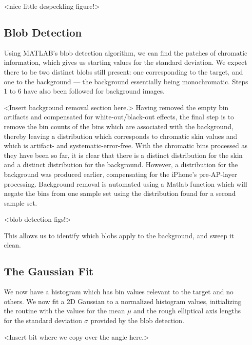 <nice little despeckling figure!>


\subsection{Blob Detection}\label{sec:BlobDetection}
Using MATLAB's blob detection algorithm, we can find the patches of chromatic information, which gives us starting values for the standard deviation. We expect there to be two distinct blobs still present: one corresponding to the target, and one to the background --- the background essentially being monochromatic. Steps 1 to 6 have also been followed for background images. 

<Insert background removal section here.>
Having removed the empty bin artifacts and compensated for white-out/black-out effects, the final step is to remove the bin counts of the bins which are associated with the background, thereby leaving a distribution which corresponds to chromatic skin values and which is artifact- and systematic-error-free. With the chromatic bins processed as they have been so far, it is clear that there is a distinct distribution for the skin and a distinct distribution for the background. However, a distribution for the background was produced earlier, compensating for the iPhone's pre-AP-layer processing. Background removal is automated using a Matlab function which will negate the bins from one sample set using the distribution found for a second sample set.

<blob detection figs!>


This allows us to identify which blobs apply to the background, and sweep it clean.


\subsection{The Gaussian Fit}\label{sec:TheGaussianFit}
We now have a histogram which has bin values relevant to the target and no others. We now fit a 2D Gaussian to a normalized histogram values, initializing the routine with the values for the mean $\mu$ and the rough elliptical axis lengths for the standard deviation $\sigma$ provided by the blob detection.

<Insert bit where we copy over the angle here.>  

